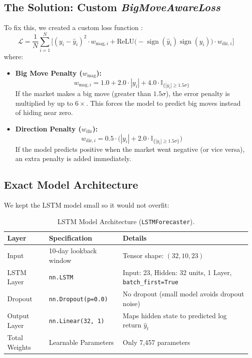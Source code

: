 \subsection{The Solution: Custom \textit{BigMoveAwareLoss}}
To fix this, we created a custom loss function :
\begin{equation}
	\mathcal{L} = \frac{1}{N}\sum_{i=1}^N \Big[ (y_i - \hat{y}_i)^2 \cdot w_{\text{mag}, i} + \text{ReLU}\big(-\operatorname{sign}(\hat{y}_i)\operatorname{sign}(y_i)\big) \cdot w_{\text{dir}, i} \Big]
\end{equation}
where:
\begin{itemize}[leftmargin=1.5cm, itemsep=1pt]
	\item \textbf{Big Move Penalty ($w_{\text{mag}}$):}
	\begin{equation}
		w_{\text{mag}, i} = 1.0 + 2.0 \cdot |y_i| + 4.0 \cdot \mathbb{I}_{\{|y_i| \ge 1.5\sigma\}}
	\end{equation}
	If the market makes a big move (greater than $1.5\sigma$), the error penalty is multiplied by up to $6\times$. This forces the model to predict big moves instead of hiding near zero.
	\item \textbf{Direction Penalty ($w_{\text{dir}}$):}
	\begin{equation}
		w_{\text{dir}, i} = 0.5 \cdot \Big( |y_i| + 2.0 \cdot \mathbb{I}_{\{|y_i| \ge 1.5\sigma\}} \Big)
	\end{equation}
	If the model predicts positive when the market went negative (or vice versa), an extra penalty is added immediately.
\end{itemize}

\subsection{Exact Model Architecture}
We kept the LSTM model small so it would not overfit:

\begin{table}[htbp]
\centering
\caption{LSTM Model Architecture (\texttt{LSTMForecaster}).}
\label{tab:lstm-arch}
\small
\begin{tabular}{lll}
\toprule
\textbf{Layer} & \textbf{Specification} & \textbf{Details} \\
\midrule
Input & 10-day lookback window & Tensor shape: $(32, 10, 23)$ \\
LSTM Layer & \texttt{nn.LSTM} & Input: 23, Hidden: 32 units, 1 Layer, \texttt{batch\_first=True} \\
Dropout & \texttt{nn.Dropout(p=0.0)} & No dropout (small model avoids dropout noise) \\
Output Layer & \texttt{nn.Linear(32, 1)} & Maps hidden state to predicted log return $\hat{y}_t$ \\
Total Weights & Learnable Parameters & Only 7,457 parameters \\
\bottomrule
\end{tabular}
\end{table}

